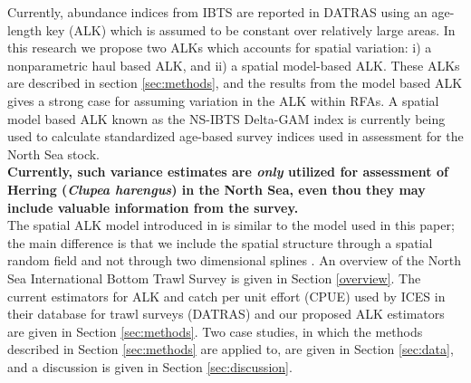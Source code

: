 \documentclass[a4paper 12pt]{article}
\numberwithin{equation}{section}
\begin{document}
Currently, abundance indices from IBTS are reported in DATRAS \citep{datras} using an age-length key (ALK) \citep{fridriksson1934calculation} which is assumed to be constant over relatively large areas. In this research we propose two ALKs which accounts for spatial variation: i) a nonparametric  haul based ALK, and ii) a spatial model-based ALK. These ALKs are described in section \ref{sec:methods}, and the results from the model based ALK gives a strong case for assuming variation in the ALK within RFAs. %
A spatial model based ALK \citep{berg2012spatial, berg2014evaluation} known as the NS-IBTS Delta-GAM index \citep{ICES2016b} is currently being used to calculate standardized age-based survey indices used in assessment for the North Sea stock. \\

{\bf Currently, such variance estimates are \textit{only} utilized for assessment of Herring (\textit{Clupea harengus}) in the North Sea, even thou they may include valuable information from the survey.} \\

The spatial ALK model introduced in \citet{berg2012spatial} is similar to the model used in this paper; the main difference is that we include the spatial structure through a spatial random field \citep{lindgren2011explicit} and not through two dimensional splines \citep{wood2017generalized}.%
 An  overview of the  North Sea International Bottom Trawl Survey is given in Section \ref{overview}. The current estimators for ALK and catch per unit effort (CPUE) used by ICES in their database for trawl surveys (DATRAS) and our proposed ALK estimators are given in Section \ref{sec:methods}. Two case studies, in which the methods described in Section \ref{sec:methods} are applied to, are given in Section \ref{sec:data}, and a discussion is given in Section \ref{sec:discussion}.%
\end{document}

